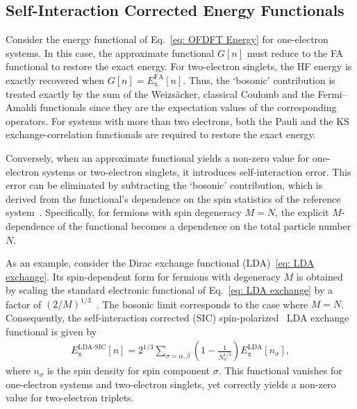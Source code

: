 \documentclass[%
 reprint,
 amsmath,amssymb,
 aps,
pra,
]{revtex4-2}
\begin{document}
\subsection{Self-Interaction Corrected Energy Functionals}

Consider the energy functional of Eq.~\eqref{eq: OFDFT Energy} for one-electron systems. In this case, the approximate functional $G[n]$ must reduce to the FA functional to restore the exact energy. For two-electron singlets, the HF energy is exactly recovered when $G[n]=E_{\text{x}}^{\text{FA}}[n]$. Thus, the `bosonic' contribution is treated exactly by the sum of the Weizsäcker, classical Coulomb and the Fermi--Amaldi functionals since they are the expectation values of the corresponding operators. For systems with more than two electrons, both the Pauli and the KS exchange-correlation functionals are required to restore the exact energy. 

Conversely, when an approximate functional yields a non-zero value for one-electron systems or two-electron singlets, it introduces self-interaction error. This error can be eliminated by subtracting the `bosonic' contribution, which is derived from the functional's dependence on the spin statistics of the reference system~\cite{Bosko.2023.PRA.108.052803}. Specifically, for fermions with spin degeneracy $M=N$, the explicit $M$-dependence of the functional becomes a dependence on the total particle number $N$.

As an example, consider the Dirac exchange functional (LDA)~\eqref{eq: LDA exchange}. Its spin-dependent form for fermions with degeneracy $M$ is obtained by scaling the standard electronic functional of Eq.~\eqref{eq: LDA exchange} by a factor of $(2/M)^{1/3}$~\cite{Bosko.2023.PRA.108.052803}. The bosonic limit corresponds to the case where $M=N$. Consequently, the self-interaction corrected (SIC) spin-polarized~\cite{Oliver.1979.PRA.20.397,Bosko.2023.PRA.108.052803} LDA exchange functional is given by
\begin{gather}\label{eq: LDA-SIC}
    E^{\text{LDA-SIC}}_{\text{x}}[n]
    =
    2^{1/3}
    \sum_{\sigma=\alpha,\beta}
    \left(
        1 - \frac{1}{N_{\sigma}^{1/3}}
    \right)
    E^{\text{LDA}}_{\text{x}}[n_{\sigma}],
\end{gather}
where $n_{\sigma}$ is the spin density for spin component $\sigma$. This functional vanishes for one-electron systems and two-electron singlets, yet correctly yields a non-zero value for two-electron triplets.
\end{document}
